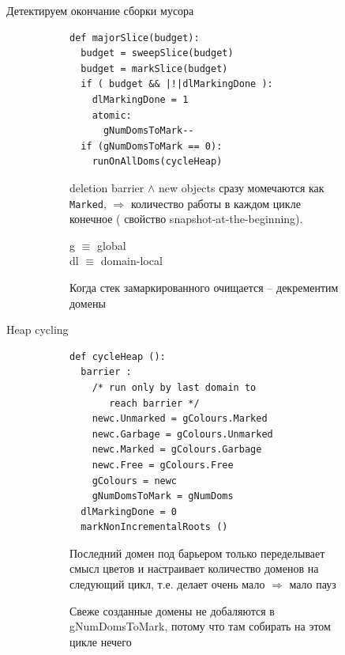 \documentclass[aspectratio=169
  , xcolor={svgnames} 
  , hyperref={ colorlinks,citecolor=DeepPink4
             , linkcolor=DarkRed,urlcolor=DarkBlue}
  , russian
  ]{beamer}
\theoremstyle{exerciseStyle1}
\begin{document}
\begin{frame}[fragile]{Детектируем окончание сборки мусора}
\begin{figure}[ht]
\begin{subfigure}{.49\textwidth}
\begin{verbatim}
def majorSlice(budget):
  budget = sweepSlice(budget)
  budget = markSlice(budget)
  if ( budget && |!|dlMarkingDone ):
    dlMarkingDone = 1
    atomic:
      gNumDomsToMark--
  if (gNumDomsToMark == 0):
    runOnAllDoms(cycleHeap)
\end{verbatim}
\end{subfigure}
\begin{subfigure}{.49\textwidth}
deletion barrier $\wedge$  new objects сразу момечаются как \texttt{Marked},  $\Rightarrow$ количество работы в каждом цикле конечное ( свойство snapshot-at-the-beginning).\vspace{.5cm}

g $\equiv$ global\\
dl $\equiv$ domain-local \vspace{.5cm}

Когда стек замаркированного очищается -- декрементим домены
\end{subfigure}
\end{figure}
\end{frame}



\begin{frame}[fragile]{Heap cycling}
\begin{figure}[ht]
\begin{subfigure}{.49\textwidth}
\begin{verbatim}
def cycleHeap ():
  barrier :
    /* run only by last domain to 
       reach barrier */
    newc.Unmarked = gColours.Marked
    newc.Garbage = gColours.Unmarked
    newc.Marked = gColours.Garbage
    newc.Free = gColours.Free
    gColours = newc
    gNumDomsToMark = gNumDoms
  dlMarkingDone = 0
  markNonIncrementalRoots ()
\end{verbatim}
\end{subfigure}
\begin{subfigure}{.49\textwidth}
Последний домен под барьером только переделывает смысл цветов и настраивает количество доменов на следующий цикл, т.е. делает очень мало $\Rightarrow$ мало пауз
\vspace{1cm}

Свеже созданные домены не добаляются в gNumDomsToMark, потому что там собирать на этом цикле нечего
\end{subfigure}
\end{figure}
\end{frame}
\end{document}
